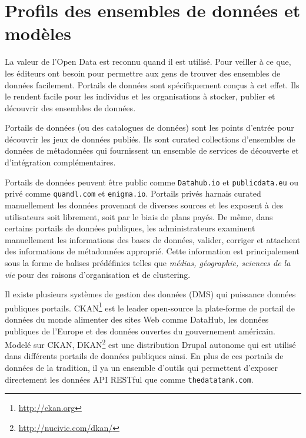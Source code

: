 \documentclass[a4paper,11pt,twoside]{ThesisStyle}
\begin{document}
\section{Profils des ensembles de données et modèles}\label{chapter:hdl}

La valeur de l'Open Data est reconnu quand il est utilisé. Pour veiller à ce que, les éditeurs ont besoin pour permettre aux gens de trouver des ensembles de données facilement. Portails de données sont spécifiquement conçus à cet effet. Ils le rendent facile pour les individus et les organisations à stocker, publier et découvrir des ensembles de données.

Portails de données (ou des catalogues de données) sont les points d'entrée pour découvrir les jeux de données publiés. Ils sont curated collections d'ensembles de données de métadonnées qui fournissent un ensemble de services de découverte et d'intégration complémentaires.

Portails de données peuvent être public comme \texttt{Datahub.io} et \texttt{publicdata.eu} ou privé comme \texttt{quandl.com} et \texttt{enigma.io}. Portails privés harnais curated manuellement les données provenant de diverses sources et les exposent à des utilisateurs soit librement, soit par le biais de plans payés. De même, dans certains portails de données publiques, les administrateurs examinent manuellement les informations des bases de données, valider, corriger et attachent des informations de métadonnées approprié. Cette information est principalement sous la forme de balises prédéfinies telles que \textit{médias, géographie, sciences de la vie} pour des raisons d'organisation et de clustering.

Il existe plusieurs systèmes de gestion des données (DMS) qui puissance données publiques portails. CKAN\footnote{\url{http://ckan.org}} est le leader open-source la plate-forme de portail de données du monde alimenter des sites Web comme DataHub, les données publiques de l'Europe et des données ouvertes du gouvernement américain. Modelé sur CKAN, DKAN\footnote{\url{http://nucivic.com/dkan/}} est une distribution Drupal autonome qui est utilisé dans différents portails de données publiques ainsi. En plus de ces portails de données de la tradition, il ya un ensemble d'outils qui permettent d'exposer directement les données API RESTful que comme \texttt{thedatatank.com}.
\end{document}
